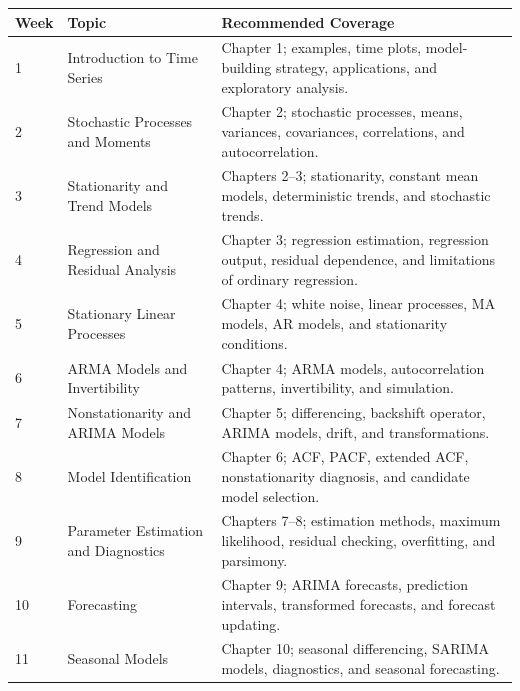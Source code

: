 \documentclass[11pt]{article}
\begin{document}
\begin{longtable}{p{} p{} p{}}
\toprule
\textbf{Week} & \textbf{Topic} & \textbf{Recommended Coverage} \\
\midrule
\endhead

1 & Introduction to Time Series & Chapter 1; examples, time plots, model-building strategy, applications, and exploratory analysis. \\

2 & Stochastic Processes and Moments & Chapter 2; stochastic processes, means, variances, covariances, correlations, and autocorrelation. \\

3 & Stationarity and Trend Models & Chapters 2--3; stationarity, constant mean models, deterministic trends, and stochastic trends. \\

4 & Regression and Residual Analysis & Chapter 3; regression estimation, regression output, residual dependence, and limitations of ordinary regression. \\

5 & Stationary Linear Processes & Chapter 4; white noise, linear processes, MA models, AR models, and stationarity conditions. \\

6 & ARMA Models and Invertibility & Chapter 4; ARMA models, autocorrelation patterns, invertibility, and simulation. \\

7 & Nonstationarity and ARIMA Models & Chapter 5; differencing, backshift operator, ARIMA models, drift, and transformations. \\

8 & Model Identification & Chapter 6; ACF, PACF, extended ACF, nonstationarity diagnosis, and candidate model selection. \\

9 & Parameter Estimation and Diagnostics & Chapters 7--8; estimation methods, maximum likelihood, residual checking, overfitting, and parsimony. \\

10 & Forecasting & Chapter 9; ARIMA forecasts, prediction intervals, transformed forecasts, and forecast updating. \\

11 & Seasonal Models & Chapter 10; seasonal differencing, SARIMA models, diagnostics, and seasonal forecasting. \\


\end{longtable}
\end{document}
